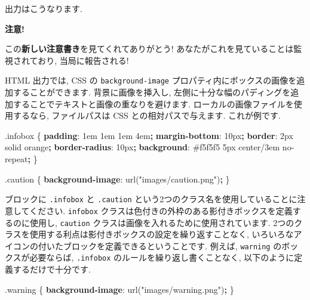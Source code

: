 \documentclass[
  11pt,
  lualatex,
  ja=standard]{bxjsreport}
\newenvironment{Shaded}{\begin{snugshade}}{\end{snugshade}}
\newcommand{\ConstantTok}[1]{\textcolor[rgb]{0.00,0.00,0.00}{#1}}
\newcommand{\DataTypeTok}[1]{\textcolor[rgb]{0.13,0.29,0.53}{#1}}
\newcommand{\DecValTok}[1]{\textcolor[rgb]{0.00,0.00,0.81}{#1}}
\newcommand{\FunctionTok}[1]{\textcolor[rgb]{0.00,0.00,0.00}{#1}}
\newcommand{\KeywordTok}[1]{\textcolor[rgb]{0.13,0.29,0.53}{\textbf{#1}}}
\newcommand{\NormalTok}[1]{#1}
\newcommand{\OperatorTok}[1]{\textcolor[rgb]{0.81,0.36,0.00}{\textbf{#1}}}
\newcommand{\StringTok}[1]{\textcolor[rgb]{0.31,0.60,0.02}{#1}}
\newenvironment{infobox}[1]{\begin{itemize}\renewcommand{\labelitemi}{\raisebox{-.7\height}[0pt][0pt]{%
  {\setkeys{Gin}{width=3em,keepaspectratio}\texttt{[image: \_latex/\_img/\#1]}}}}
  \setlength{\fboxsep}{1em}
  \begin{greyblock}
  \item
  }{\end{greyblock}\end{itemize}
}
\begin{document}
出力はこうなります.

\begin{infobox}{caution}
\textbf{注意!}

この\textbf{新しい注意書き}を見てくれてありがとう! あなたがこれを見ていることは監視されており, 当局に報告される!

\end{infobox}

HTML 出力では, CSS の \texttt{background-image} プロパティ内にボックスの画像を追加することができます. 背景に画像を挿入し, 左側に十分な幅のパディングを追加することでテキストと画像の重なりを避けます. ローカルの画像ファイルを使用するなら, ファイルパスは CSS との相対パスで与えます. これが例です.

\begin{Shaded}
\begin{Highlighting}[]
\FunctionTok{.infobox}\NormalTok{ \{}
  \KeywordTok{padding}\NormalTok{: }\DecValTok{1}\DataTypeTok{em} \DecValTok{1}\DataTypeTok{em} \DecValTok{1}\DataTypeTok{em} \DecValTok{4}\DataTypeTok{em}\OperatorTok{;}
  \KeywordTok{margin{-}bottom}\NormalTok{: }\DecValTok{10}\DataTypeTok{px}\OperatorTok{;}
  \KeywordTok{border}\NormalTok{: }\DecValTok{2}\DataTypeTok{px} \DecValTok{solid} \ConstantTok{orange}\OperatorTok{;}
  \KeywordTok{border{-}radius}\NormalTok{: }\DecValTok{10}\DataTypeTok{px}\OperatorTok{;}
  \KeywordTok{background}\NormalTok{: }\ConstantTok{\#f5f5f5} \DecValTok{5}\DataTypeTok{px} \DecValTok{center}\NormalTok{/}\DecValTok{3}\DataTypeTok{em} \DecValTok{no{-}repeat}\OperatorTok{;}
\NormalTok{\}}

\FunctionTok{.caution}\NormalTok{ \{}
  \KeywordTok{background{-}image}\NormalTok{: }\FunctionTok{url(}\StringTok{"images/caution.png"}\FunctionTok{)}\OperatorTok{;}
\NormalTok{\}}
\end{Highlighting}
\end{Shaded}

ブロックに \texttt{.infobox} と \texttt{.caution} という2つのクラス名を使用していることに注意してください. \texttt{infobox} クラスは色付きの外枠のある影付きボックスを定義するのに使用し, \texttt{caution} クラスは画像を入れるために使用されています. 2つのクラスを使用する利点は影付きボックスの設定を繰り返すことなく, いろいろなアイコンの付いたブロックを定義できるということです. 例えば, \texttt{warning} のボックスが必要ならば, \texttt{.infobox} のルールを繰り返し書くことなく, 以下のように定義するだけで十分です.

\begin{Shaded}
\begin{Highlighting}[]
\FunctionTok{.warning}\NormalTok{ \{}
  \KeywordTok{background{-}image}\NormalTok{: }\FunctionTok{url(}\StringTok{"images/warning.png"}\FunctionTok{)}\OperatorTok{;}
\NormalTok{\}}
\end{Highlighting}
\end{Shaded}
\end{document}
